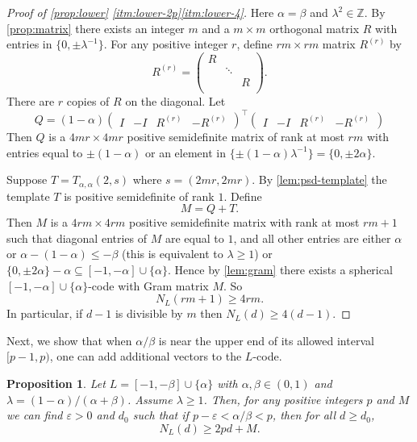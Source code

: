 \documentclass[reqno, 11pt]{amsart}
\newtheorem{proposition}[theorem]{Proposition}
\theoremstyle{definition}
\theoremstyle{remark}
\newcommand{\ZZ}{\mathbb{Z}}
\begin{document}
\begin{proof}[Proof of \cref{prop:lower} \ref{itm:lower-2p}\ref{itm:lower-4}]
Here $\alpha = \beta$ and $\lambda^2 \in \ZZ$. By \cref{prop:matrix} there exists an integer $m$ and a $m \times m$ orthogonal matrix $R$ with entries in $\{0, \pm \lambda^{-1}\}$. For any positive integer $r$, define $rm \times rm$ matrix $R^{(r)}$ by 
\[
    R^{(r)} =  \begin{pmatrix}
                R & & \\
                & \ddots & \\
                & & R \\
                \end{pmatrix}.
\]
There are $r$ copies of $R$ on the diagonal. Let
\[
			 Q = (1-\alpha)
			 \begin{pmatrix}
					 I & - I & R^{(r)} & -R^{(r)}
			 \end{pmatrix}^\intercal
			 \begin{pmatrix}
				     I & - I & R^{(r)} & -R^{(r)}
			 \end{pmatrix}
\]
Then $Q$ is a $4mr \times 4mr$ positive semidefinite matrix of rank at most $rm$ with entries equal to $\pm(1-\alpha)$ or an element in $\{\pm(1-\alpha)\lambda^{-1}\} = \{0, \pm2 \alpha\}$.

Suppose $T = T_{\alpha, \alpha}(2,s)$ where $s = (2mr, 2mr)$. By \cref{lem:psd-template} the template $T$ is positive semidefinite of rank $1$. Define
\[
    M = Q + T.
\]
Then $M$ is a $4rm \times 4rm$ positive semidefinite matrix with rank at most $rm + 1$ such that diagonal entries of $M$ are equal to $1$, and all other entries are either $\alpha$ or $\alpha - (1-\alpha) \leq -\beta$ (this is equivalent to $\lambda \geq 1$) or $\{0,\pm2\alpha\}-\alpha \subseteq [-1,-\alpha]\cup \{\alpha\}$. Hence by \cref{lem:gram} there exists a spherical $[-1,-\alpha] \cup \{\alpha\}$-code with Gram matrix $M$. So 
\[
    N_L(rm +1) \geq 4rm.
\]
In particular, if $d - 1$ is divisible by $m$ then $N_L(d) \geq 4(d-1)$.
\end{proof}

Next, we show that when $\alpha/\beta$ is near the upper end of its allowed interval $[p-1,p)$, one can add additional vectors to the $L$-code.

\begin{proposition}\label{prop:lower-extra}
     Let $L = [-1,-\beta]\cup \{\alpha\}$ with $\alpha, \beta \in (0,1)$ and $\lambda = (1-\alpha)/(\alpha + \beta)$. Assume $\lambda \ge 1$.
     Then, for any positive integers $p$ and $M$ we can find $\varepsilon > 0$ and $d_0$ such that if $p-\varepsilon < \alpha/\beta < p$, then for all $d \geq d_0$,
    \[
         N_L(d) \geq 2pd + M.
    \]
\end{proposition}
\end{document}
